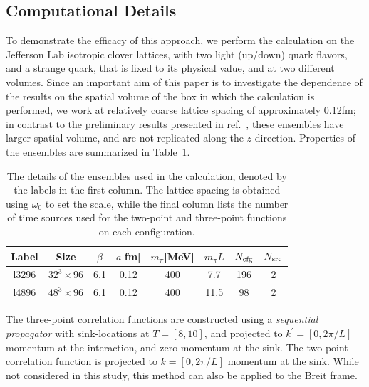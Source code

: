 \documentclass[prd,aps,twocolumn,superscriptaddress,tightenlines,nofootinbib,floatfix,preprintnumbers,10pt]{revtex4-1}
\begin{document}
\subsection{Computational Details}
To demonstrate the efficacy of this approach, we perform the
calculation on the Jefferson Lab isotropic clover lattices, with two light
(up/down) quark flavors, and a strange quark, that is fixed to its
physical value, and at two different volumes.  Since an important aim
of this paper is to investigate the dependence of the results on the
spatial volume of the box in which the calculation is performed, we
work at relatively coarse lattice spacing of approximately 0.12fm; in contrast to the
preliminary results presented in ref.~\cite{Bouchard:2016gmc}, these
ensembles have larger spatial volume, and are not replicated along the $z$-direction.  Properties of the ensembles are summarized in Table~\ref{tab:cfg}.
\begin{table}
  \begin{tabular}{cccccccc}
  	\hline\hline
    Label & Size & $\beta$ & $a$[fm] & $m_\pi$[MeV] & $m_\pi L$ & $N_{\rm cfg}$ & $N_{\rm src}$\\
    \hline
    l3296 & $32^3 \times 96$ & 6.1 & 0.12 & 400 & 7.7 & 196 & 2\\
    l4896 & $48^3 \times 96$ & 6.1 & 0.12 & 400 & 11.5 & 98 & 2\\
    \hline\hline
  \end{tabular}
  \caption{The details of the ensembles used in the calculation, denoted by the labels in the first column.  The
    lattice spacing is obtained using $\omega_0$ to set the scale,
    while the final column lists the number of time sources used for
    the two-point and three-point functions on each
    configuration.\label{tab:cfg}}
\end{table}


The three-point correlation functions are constructed using a \textit{sequential propagator} with sink-locations at $T=[8,10]$, and projected to $k^\prime=[0,2\pi/L]$ momentum at the interaction, and zero-momentum at the sink. The two-point correlation function is projected to $k=[0,2\pi/L]$ momentum at the sink. While not considered in this study, this method can also be applied to the Breit frame.
\end{document}
